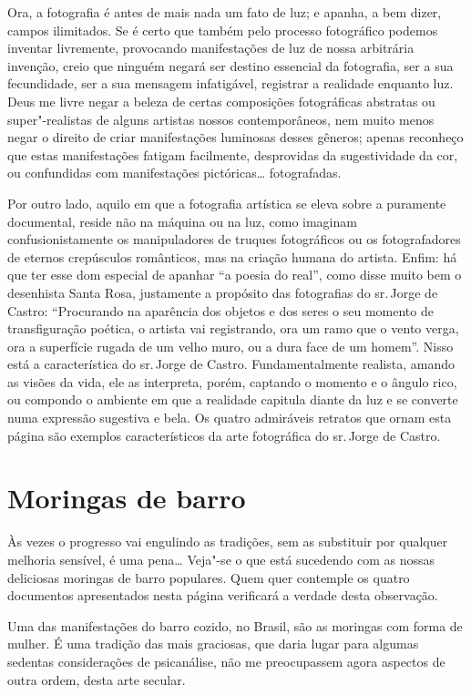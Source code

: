 Ora, a fotografia é antes de mais nada um fato de luz; e apanha, a bem
dizer, campos ilimitados. Se é certo que também pelo processo
fotográfico podemos inventar livremente, provocando manifestações de luz
de nossa arbitrária invenção, creio que ninguém negará ser destino
essencial da fotografia, ser a sua fecundidade, ser a sua mensagem
infatigável, registrar a realidade enquanto luz. Deus me livre negar a
beleza de certas composições fotográficas abstratas ou super"-realistas
de alguns artistas nossos contemporâneos, nem muito menos negar o
direito de criar manifestações luminosas desses gêneros; apenas
reconheço que estas manifestações fatigam facilmente, desprovidas da
sugestividade da cor, ou confundidas com manifestações pictóricas\ldots{}
fotografadas.

Por outro lado, aquilo em que a fotografia artística se eleva sobre a
puramente documental, reside não na máquina ou na luz, como imaginam
confusionistamente os manipuladores de truques fotográficos ou os
fotografadores de eternos crepúsculos românticos, mas na criação humana
do artista. Enfim: há que ter esse dom especial de apanhar ``a poesia do
real'', como disse muito bem o desenhista Santa Rosa, justamente a
propósito das fotografias do sr.\,Jorge de Castro: ``Procurando na
aparência dos objetos e dos seres o seu momento de transfiguração
poética, o artista vai registrando, ora um ramo que o vento verga, ora a
superfície rugada de um velho muro, ou a dura face de um homem''. Nisso
está a característica do sr.\,Jorge de Castro. Fundamentalmente realista,
amando as visões da vida, ele as interpreta, porém, captando o momento e
o ângulo rico, ou compondo o ambiente em que a realidade capitula diante
da luz e se converte numa expressão sugestiva e bela. Os quatro
admiráveis retratos que ornam esta página são exemplos característicos
da arte fotográfica do sr.\,Jorge de Castro.

\chapter{Moringas de barro}

Às vezes o progresso vai engulindo as tradições, sem as substituir por
qualquer melhoria sensível, é uma pena\ldots{} Veja"-se o que está sucedendo
com as nossas deliciosas moringas de barro populares. Quem quer
contemple os quatro documentos apresentados nesta página verificará a
verdade desta observação.

Uma das manifestações do barro cozido, no Brasil, são as moringas com
forma de mulher. É uma tradição das mais graciosas, que daria lugar para
algumas sedentas considerações de psicanálise, não me preocupassem agora
aspectos de outra ordem, desta arte secular.

